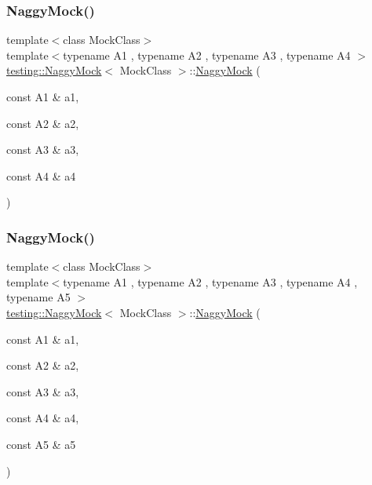 \mbox{\label{classtesting_1_1_naggy_mock_aa7d63f62600171db931c6bbb4c2a6d52}} 
\subsubsection{\texorpdfstring{NaggyMock()}{NaggyMock()}\hspace{0.1cm}{\footnotesize\ttfamily [11/17]}}
{\footnotesize\ttfamily template$<$class Mock\+Class$>$ \\
template$<$typename A1 , typename A2 , typename A3 , typename A4 $>$ \\
\mbox{\hyperlink{classtesting_1_1_naggy_mock}{testing\+::\+Naggy\+Mock}}$<$ Mock\+Class $>$\+::\mbox{\hyperlink{classtesting_1_1_naggy_mock}{Naggy\+Mock}} (\begin{DoxyParamCaption}\item[{const A1 \&}]{a1,  }\item[{const A2 \&}]{a2,  }\item[{const A3 \&}]{a3,  }\item[{const A4 \&}]{a4 }\end{DoxyParamCaption})\hspace{0.3cm}{\ttfamily [inline]}}

\mbox{\label{classtesting_1_1_naggy_mock_ac751c8a708935bd8558c9665160f7144}} 
\subsubsection{\texorpdfstring{NaggyMock()}{NaggyMock()}\hspace{0.1cm}{\footnotesize\ttfamily [12/17]}}
{\footnotesize\ttfamily template$<$class Mock\+Class$>$ \\
template$<$typename A1 , typename A2 , typename A3 , typename A4 , typename A5 $>$ \\
\mbox{\hyperlink{classtesting_1_1_naggy_mock}{testing\+::\+Naggy\+Mock}}$<$ Mock\+Class $>$\+::\mbox{\hyperlink{classtesting_1_1_naggy_mock}{Naggy\+Mock}} (\begin{DoxyParamCaption}\item[{const A1 \&}]{a1,  }\item[{const A2 \&}]{a2,  }\item[{const A3 \&}]{a3,  }\item[{const A4 \&}]{a4,  }\item[{const A5 \&}]{a5 }\end{DoxyParamCaption})\hspace{0.3cm}{\ttfamily [inline]}}


